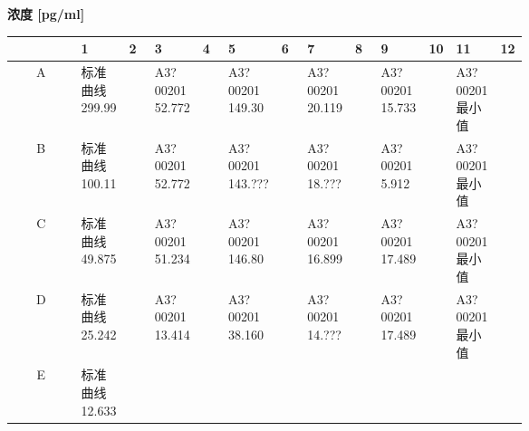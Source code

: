 \documentclass[UTF8,10pt,a4paper,fontset=fandol]{ctexart}
\renewcommand{\arraystretch}{1.15}
\begin{document}
\vspace{1em}

\noindent\textbf{浓度 [pg/ml]}

\vspace{0.3em}

\begin{center}
\scriptsize
\renewcommand{\arraystretch}{1.35}
\begin{tabular}{c|*{12}{p{0.055\linewidth}|}}
 & 1 & 2 & 3 & 4 & 5 & 6 & 7 & 8 & 9 & 10 & 11 & 12\\ \hline
A &
\shortstack{标准曲线\\299.99} &
 &
\shortstack{A3?00201\\52.772} &
 &
\shortstack{A3?00201\\149.30} &
 &
\shortstack{A3?00201\\20.119} &
 &
\shortstack{A3?00201\\15.733} &
 &
\shortstack{A3?00201\\最小值} &
\\ \hline
B &
\shortstack{标准曲线\\100.11} &
 &
\shortstack{A3?00201\\52.772} &
 &
\shortstack{A3?00201\\143.???} &
 &
\shortstack{A3?00201\\18.???} &
 &
\shortstack{A3?00201\\5.912} &
 &
\shortstack{A3?00201\\最小值} &
\\ \hline
C &
\shortstack{标准曲线\\49.875} &
 &
\shortstack{A3?00201\\51.234} &
 &
\shortstack{A3?00201\\146.80} &
 &
\shortstack{A3?00201\\16.899} &
 &
\shortstack{A3?00201\\17.489} &
 &
\shortstack{A3?00201\\最小值} &
\\ \hline
D &
\shortstack{标准曲线\\25.242} &
 &
\shortstack{A3?00201\\13.414} &
 &
\shortstack{A3?00201\\38.160} &
 &
\shortstack{A3?00201\\14.???} &
 &
\shortstack{A3?00201\\17.489} &
 &
\shortstack{A3?00201\\最小值} &
\\ \hline
E &
\shortstack{标准曲线\\12.633} &

\end{tabular}
\end{center}
\end{document}
